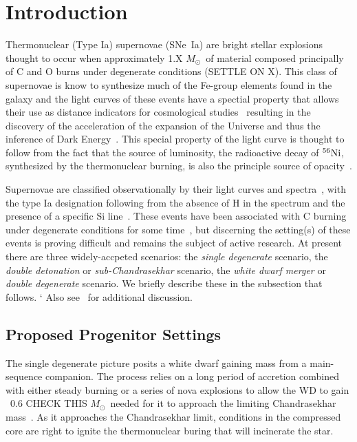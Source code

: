 \documentclass[iop,apj]{emulateapj}
\newcommand{\SNeIa}{SNe~Ia}
\newcommand{\Ni}[1]{\ensuremath{{}^{#1}{\rm Ni}}}
\newcommand{\Msun}{\ensuremath{M_\odot}}
\begin{document}
\section{Introduction}
\label{sec:intro}
Thermonuclear (Type Ia) supernovae (\SNeIa) are bright stellar explosions 
thought to occur when approximately 1.X \Msun\ of material composed principally 
of C and O burns under degenerate conditions (SETTLE ON X). This class of supernovae is
know to synthesize much of the Fe-group elements found in the galaxy and
the light curves of these events have a spectial property that allows
their use as distance indicators for cosmological studies~\citep{phillips:absolute}
resulting in the discovery of the acceleration of the expansion of
the Universe and thus the inference of Dark 
Energy~\citep{riess.filippenko.ea:observational,
perlmutter.aldering.ea:measurements,leibundgut2001}. 
This special property of the light curve is thought to follow
from the fact that the source of luminosity, the radioactive decay
of \Ni{56}, synthesized by the thermonuclear burning, is also the
principle source of opacity~\citep{Pinto2001The-type-Ia-sup}. 

Supernovae are classified observationally 
by their light curves and spectra~\citep{minkowski41,bertola64,porterfilippenko87,
wheelerharkness1990conf,Fili97}, with the type Ia designation following from
the absence of H in the spectrum and the presence of a specific Si 
line~\citep{filippenko:optical,hillebrandt.niemeyer:type}. These events
have been associated with C burning under degenerate conditions
for some time~\citep{hoylefowler60,arnett.truran.ea:nucleosynthesis},
but discerning the setting(s) of these events is proving difficult
and remains the subject of active research. At present there are three
widely-accpeted scenarios: the {\em single degenerate} scenario,
the {\em double detonation} or {\em sub-Chandrasekhar} scenario, 
the {\em white dwarf merger} or {\em double degenerate} scenario.
We briefly describe these in the subsection that follows. `
Also see~\citet{hillebrandt.niemeyer:type,howell2011,hillebrandtetal2013,calderetal2013}
for additional discussion.

\subsection{Proposed Progenitor Settings}

The single degenerate picture posits a white dwarf gaining mass
from a main-sequence companion. The process relies on a long
period of accretion combined with either steady burning or a 
series of nova explosions to allow the WD to gain
~0.6 CHECK THIS \Msun\ needed for it to approach the
limiting Chandrasekhar mass~\citep{starrfieldetal2012}. As it approaches
the Chandrasekhar limit, conditions in the compressed core are right
to ignite the thermonuclear buring that will incinerate the star. 
\end{document}
